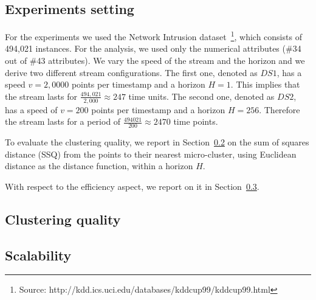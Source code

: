 \subsection{Experiments setting}
For the experiments we used the Network Intrusion dataset~\footnote{Source: http://kdd.ics.uci.edu/databases/kddcup99/kddcup99.html}, which consists of 494,021 instances. For the analysis, we used only the numerical attributes (\#34 out of \#43 attributes).
We vary the speed of the stream and the horizon and we derive two different stream configurations.
The first one, denoted as $DS1$, has a speed $v=2,0000$ points per timestamp and a horizon $H=1$. This implies that the stream lasts for $\frac{494,021}{2,000} \approx 247$ time units. 
The second one, denoted as $DS2$, has a speed of $v=200$ points per timestamp and a horizon $H=256$. Therefore the stream lasts for a period of $\frac{494021}{200} \approx 2470$ time points.

To evaluate the clustering quality, we report in Section~\ref{sec:expQuality} on the sum of squares distance (SSQ) from the points to their nearest micro-cluster, using Euclidean distance as the distance function, within a horizon $H$.

With respect to the efficiency aspect, we report on it in Section~\ref{sec:expScalability}. 

\subsection{Clustering quality}
\label{sec:expQuality}



\subsection{Scalability}
\label{sec:expScalability}
